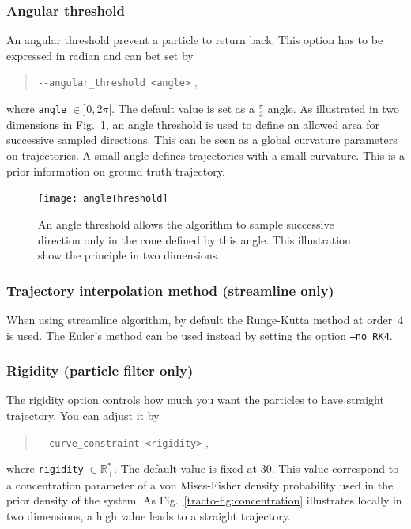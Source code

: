     \subsubsection*{Angular threshold}
        An angular threshold prevent a particle to return back. This option has 
        to be expressed in radian and can bet set by
            \begin{quote}
                \texttt{-\hspace{0.1mm}-angular\_threshold <angle>} \enspace ,
            \end{quote}
        where \texttt{angle}$\;\in]0,2\pi[$. The default value is set as a 
        $\tfrac{\pi}{3}$ angle. As illustrated in two dimensions in
Fig.~\ref{tracto-fig:angleThreshold}, an angle threshold is used to define an
allowed area for successive sampled directions. This can be seen as a global
curvature parameters on trajectories. A small angle defines trajectories with a
small curvature. This is a prior information on ground truth trajectory.

        \begin{figure}
            \centering
            \texttt{[image: angleThreshold]}
            \caption{An angle threshold allows the algorithm to sample
successive direction only in the cone defined by this angle. This
illustration show the principle in two dimensions.}
            \label{tracto-fig:angleThreshold}
        \end{figure}
        
    \subsubsection*{Trajectory interpolation method (streamline only)}
    
        When using streamline algorithm, by default the Runge-Kutta method at order~4 is used. The Euler's method can be used instead by setting the option \texttt{--no\_RK4}.


    \subsubsection*{Rigidity (particle filter only)}
        The rigidity option controls how much you want the particles to have 
        straight trajectory. You can adjust it by
            \begin{quote}
                \texttt{-\hspace{0.1mm}-curve\_constraint <rigidity>} \enspace ,
            \end{quote}
        where \texttt{rigidity}$\;\in\mathbb{R}_+^*$. The default value is
fixed at 30. This value correspond to a concentration parameter of a von
Mises-Fisher density probability used in the prior density of the system. As
Fig.~\ref{tracto-fig:concentration} illustrates locally in two dimensions, a
high value leads to a straight trajectory.


